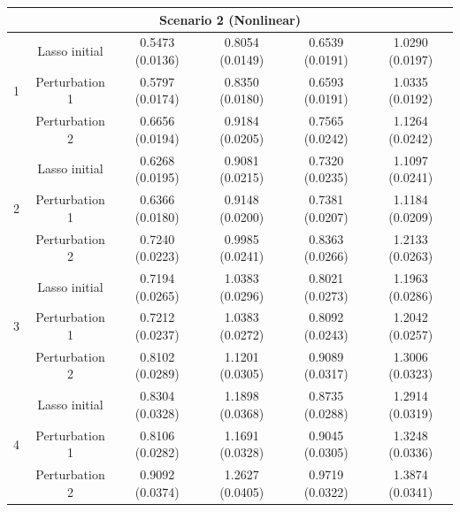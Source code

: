 \documentclass[12pt]{article}
\begin{document}
\begin{table}[!ht]
\begin{tabular}{cccccc}
        \hline
             \multicolumn{6}{c}{\textbf{Scenario 2 (Nonlinear)}}\\
    \hline
    \multirow{3}{*}{1} 
    & Lasso initial & 0.5473 (0.0136) & 0.8054 (0.0149) & 0.6539 (0.0191) & 1.0290 (0.0197) \\ 
    & Perturbation 1 & 0.5797 (0.0174) & 0.8350 (0.0180) & 0.6593 (0.0191) & 1.0335 (0.0192) \\ 
    & Perturbation 2 & 0.6656 (0.0194) & 0.9184 (0.0205) & 0.7565 (0.0242) & 1.1264 (0.0242) \\
    \hline
    \multirow{3}{*}{2} 
    & Lasso initial & 0.6268 (0.0195) & 0.9081 (0.0215) & 0.7320 (0.0235) & 1.1097 (0.0241) \\ 
    & Perturbation 1 & 0.6366 (0.0180) & 0.9148 (0.0200) & 0.7381 (0.0207) & 1.1184 (0.0209) \\ 
    & Perturbation 2 & 0.7240 (0.0223) & 0.9985 (0.0241) & 0.8363 (0.0266) & 1.2133 (0.0263) \\
    \hline
    \multirow{3}{*}{3} 
    & Lasso initial & 0.7194 (0.0265) & 1.0383 (0.0296) & 0.8021 (0.0273) & 1.1963 (0.0286) \\ 
    & Perturbation 1 & 0.7212 (0.0237) & 1.0383 (0.0272) & 0.8092 (0.0243) & 1.2042 (0.0257) \\
    & Perturbation 2 & 0.8102 (0.0289) & 1.1201 (0.0305) & 0.9089 (0.0317) & 1.3006 (0.0323) \\
    \hline
    \multirow{3}{*}{4} 
    & Lasso initial & 0.8304 (0.0328) & 1.1898 (0.0368) & 0.8735 (0.0288) & 1.2914 (0.0319) \\ 
    & Perturbation 1 & 0.8106 (0.0282) & 1.1691 (0.0328) & 0.9045 (0.0305) & 1.3248 (0.0336) \\ 
    & Perturbation 2 & 0.9092 (0.0374) & 1.2627 (0.0405) & 0.9719 (0.0322) & 1.3874 (0.0341) \\


\end{tabular}
\end{table}
\end{document}
